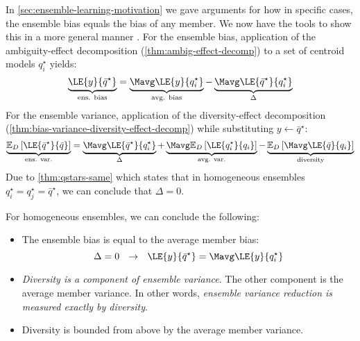 \documentclass[../main.tex]{subfiles}
\begin{document}
In \cref{sec:ensemble-learning-motivation} we gave arguments for how in specific cases, the ensemble bias equals the bias of any member. We now have the tools to show this in a more general manner \cite{wood_UnifiedTheoryDiversity_2023}.
For the ensemble bias, application of the ambiguity-effect decomposition (\cf \ref{thm:ambig-effect-decomp}) to a set of centroid models $q_{i}^\star$ yields:
$$
\underbrace{
\LE{y}{\bar{q}^\star} 
}_{\text{ens. bias}}
= 
\underbrace{
\Mavg \LE{y}{q_{i}^\star}
}_{\text{avg. bias}}
- 
\underbrace{
\Mavg\LE{\bar{q}^\star}{q_{i}^\star}
}_{\Delta}
$$
For the ensemble variance, application of the diversity-effect decomposition (\ref{thm:bias-variance-diversity-effect-decomp}) while substituting $y \gets \bar{q}^\star$:
$$
\underbrace{
\mathbb{E}_{D}\left[ \LE{\bar{q}^\star}{\bar{q}} \right]
}_{\text{ens. var.}}
 = 
\underbrace{
\Mavg \LE{\bar{q}^\star}{q_{i}^\star} 
}_{\Delta}
+ 
\underbrace{
\Mavg \mathbb{E}_{D}\left[ \LE{q_{i}^\star}{q_{i}} \right] 
}_{\text{avg. var.}}
- 
\underbrace{
\mathbb{E}_{D}\left[ \Mavg \LE{\bar{q}}{q_{i}} \right] 
}_{\text{diversity}}
$$
Due to \cref{thm:qstars-same} which states that in homogeneous ensembles $q_{i}^\star = q_{j}^\star = \bar{q}^\star$, we can conclude that $\Delta = 0$. 
\begin{corollary} For homogeneous ensembles, we can conclude the following:
\begin{itemize}
    \item The ensemble bias is equal to the average member bias:
$$
\Delta = 0 ~ ~ \rightarrow ~ ~ \LE{y}{\bar{q}^\star} = \Mavg \LE{y}{q_{i}^\star}
$$
\item \textit{Diversity is a component of ensemble variance}. The other component is the average member variance. In other words, \textit{ensemble variance reduction is measured exactly by diversity}. 
\item Diversity is bounded from above by the average member variance.
\end{itemize}
\end{corollary}





\end{document}
